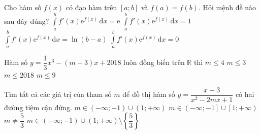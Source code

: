 \begin{ex}%
Cho hàm số $f(x)$ có đạo hàm trên $[a;b]$ và $f(a)=f(b)$. Hỏi mệnh đề nào sau đây đúng?
\choice
{$\displaystyle\int\limits_{a}^{b} f'(x)\mathrm{e}^{f(x)}\mathrm{\,d}x=\mathrm{e}$}
{$\displaystyle\int\limits_{a}^{b} f'(x)\mathrm{e}^{f(x)}\mathrm{\,d}x=1$}
{$\displaystyle\int\limits_{a}^{b} f'(x)\mathrm{e}^{f(x)}\mathrm{\,d}x=\ln(b-a)$}
{\True $\displaystyle\int\limits_{a}^{b} f'(x)\mathrm{e}^{f(x)}\mathrm{\,d}x=0$}
\end{ex}

\begin{ex}%
Hàm số $y=\dfrac{1}{3}x^3-(m-3)x+2018$ luôn đồng biến trên $\mathbb{R}$ thì
\choice
{$m \le 4$}
{\True $m\le 3$}
{$m\le 2018$}
{$m\le 9$}
\end{ex}

\begin{ex}%
Tìm tất cả các giá trị của tham số $m$ để đồ thị hàm số $y=\dfrac{x-3}{x^2-2mx+1}$ có hai đường tiệm cận đứng.
\choice
{$m\in \left( -\infty;-1 \right)\cup\left( 1;+\infty \right)$}
{$m\in \left( -\infty;-1 \right]\cup\left[ 1;+\infty \right)$}
{$m\ne\dfrac{5}{3}$}
{\True $m\in \left( -\infty;-1 \right)\cup\left( 1;+\infty \right)\setminus \left\{\dfrac{5}{3}\right\}$}
\end{ex}

